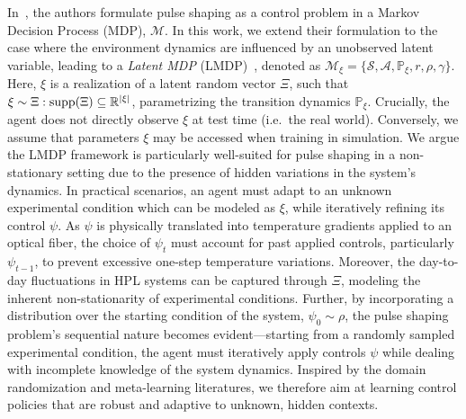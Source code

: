 In~\cite{capuano2023temporl}, the authors formulate pulse shaping as a control problem in a Markov Decision Process (MDP), \( \mathcal{M} \). In this work, we extend their formulation to the case where the environment dynamics are influenced by an unobserved latent variable, leading to a \textit{Latent MDP} (LMDP)~\citep{chen2021understanding}, denoted as \(\mathcal{M}_\xi = \{\mathcal{S}, \mathcal{A}, \mathbb{P}_\xi, r, \rho, \gamma\}\). Here, \( \xi \) is a realization of a latent random vector \( \Xi \), such that \(\xi \sim \Xi : \operatorname{supp}(\Xi) \subseteq \mathbb{R}^{|\xi|}\), parametrizing the transition dynamics \( \mathbb{P}_\xi \). Crucially, the agent does not directly observe \( \xi \) at test time (i.e.~the real world).
Conversely, we assume that parameters \( \xi \) may be accessed when training in simulation.
We argue the LMDP framework is particularly well-suited for pulse shaping in a non-stationary setting due to the presence of hidden variations in the system's dynamics. In practical scenarios, an agent must adapt to an unknown experimental condition which can be modeled as \( \xi \), while iteratively refining its control \( \psi \). As \( \psi \) is physically translated into temperature gradients applied to an optical fiber, the choice of \( \psi_t \) must account for past applied controls, particularly \( \psi_{t-1} \), to prevent excessive one-step temperature variations. Moreover, the day-to-day fluctuations in HPL systems can be captured through \( \Xi\), modeling the inherent non-stationarity of experimental conditions. Further, by incorporating a distribution over the starting condition of the system, \( \psi_0 \sim \rho \), the pulse shaping problem's sequential nature becomes evident---starting from a randomly sampled experimental condition, the agent must iteratively apply controls \(\psi\) while dealing with incomplete knowledge of the system dynamics.
Inspired by the domain randomization and meta-learning literatures, we therefore aim at learning control policies that are robust and adaptive to unknown, hidden contexts.

